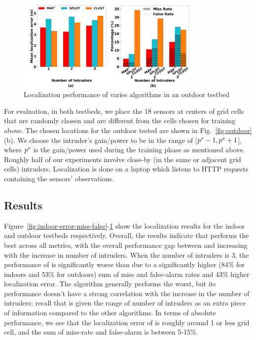 \begin{figure}[ht]
	\centering
	\includegraphics[width=0.8\textwidth]{chapters/ipsn/figures/outdoor-error-missfalse.png}
	\caption{Localization performance of varies algorithms in an outdoor testbed}
	\label{fig:outdoor-error-miss-false}
\end{figure}

  For evaluation, in both testbeds, we place the 18
sensors at centers of grid cells that are randomly chosen and are
different from the cells chosen for training above. The chosen
locations for the outdoor tested are shown in
Fig.~\ref{fig:outdoor}(b). We choose the intruder's gain/power to be
in the range of [$p^*-1, p^*+1$], where $p^*$ is the
gain/power used during the training phase as mentioned above.
Roughly half of our experiments involve close-by (in the same or
adjacent grid cells) intruders. Localization is done on a laptop which
listens to HTTP requests containing the sensors' observations. 

\subsection{Results}




Figure~\ref{fig:indoor-error-miss-false}-\ref{fig:outdoor-error-miss-false}
show the localization results for the indoor and outdoor testbeds
respectively. Overall, the results indicate that \ouralgo performs the
best across all metrics, with the overall performance gap between
\ouralgo and \splot increasing with the increase in number of
intruders. When the number of intruders is 3, the performance of
\splot is significantly worse than \ouralgo due to a
significantly higher (84\% for indoors and 53\% for outdoors) sum of miss and false-alarm rates and 43\% higher localization error.
The \cl algorithm generally performs the worst, but its
performance doesn't have a strong correlation with the increase in the
number of intruders; recall that \cl is given the range of number of
intruders as an extra piece of information compared to the other
algorithms.  In terms of absolute performance, we see that the
localization error of \ouralgo is roughly around 1 or less grid cell,
and the sum of miss-rate and false-alarm is between 5-15\%.


